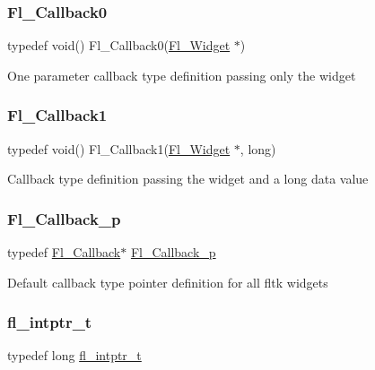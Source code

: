 \subsubsection{\texorpdfstring{Fl\+\_\+\+Callback0}{Fl\_Callback0}}
{\footnotesize\ttfamily typedef void() Fl\+\_\+\+Callback0(\hyperlink{class_fl___widget}{Fl\+\_\+\+Widget} $\ast$)}

One parameter callback type definition passing only the widget \mbox{\label{_fl___widget_8_h_a25bc4848432a4fbd426456f2952712eb}} 
\subsubsection{\texorpdfstring{Fl\+\_\+\+Callback1}{Fl\_Callback1}}
{\footnotesize\ttfamily typedef void() Fl\+\_\+\+Callback1(\hyperlink{class_fl___widget}{Fl\+\_\+\+Widget} $\ast$, long)}

Callback type definition passing the widget and a long data value \mbox{\label{_fl___widget_8_h_ad515601d7e8cbd1c65ece6364e8c23d0}} 
\subsubsection{\texorpdfstring{Fl\+\_\+\+Callback\+\_\+p}{Fl\_Callback\_p}}
{\footnotesize\ttfamily typedef \hyperlink{_fl___widget_8_h_a640bea0193560eec20903c45c93c7472}{Fl\+\_\+\+Callback}$\ast$ \hyperlink{_fl___widget_8_h_ad515601d7e8cbd1c65ece6364e8c23d0}{Fl\+\_\+\+Callback\+\_\+p}}

Default callback type pointer definition for all fltk widgets \mbox{\label{_fl___widget_8_h_a6c7d27e81f16857f18da5e4ce097de75}} 
\subsubsection{\texorpdfstring{fl\+\_\+intptr\+\_\+t}{fl\_intptr\_t}}
{\footnotesize\ttfamily typedef long \hyperlink{_fl___widget_8_h_a6c7d27e81f16857f18da5e4ce097de75}{fl\+\_\+intptr\+\_\+t}}

